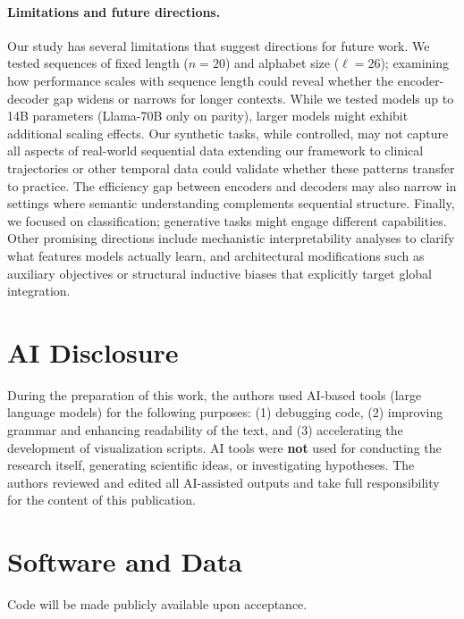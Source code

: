 \documentclass{article}
\theoremstyle{plain}
\theoremstyle{definition}
\theoremstyle{remark}
\begin{document}
\paragraph{Limitations and future directions.} Our study has several limitations that suggest directions for future work. We tested sequences of fixed length ($n=20$) and alphabet size ($\ell=26$); examining how performance scales with sequence length could reveal whether the encoder-decoder gap widens or narrows for longer contexts. While we tested models up to 14B parameters (Llama-70B only on parity), larger models might exhibit additional scaling effects. Our synthetic tasks, while controlled, may not capture all aspects of real-world sequential data extending our framework to clinical trajectories or other temporal data could validate whether these patterns transfer to practice. The efficiency gap between encoders and decoders may also narrow in settings where semantic understanding complements sequential structure. Finally, we focused on classification; generative tasks might engage different capabilities. Other promising directions include mechanistic interpretability analyses to clarify what features models actually learn, and architectural modifications such as auxiliary objectives or structural inductive biases that explicitly target global integration.


\section*{AI Disclosure}
During the preparation of this work, the authors used AI-based tools (large language models) for the following purposes: (1) debugging code, (2) improving grammar and enhancing readability of the text, and (3) accelerating the development of visualization scripts. AI tools were \textbf{not} used for conducting the research itself, generating scientific ideas, or investigating hypotheses. The authors reviewed and edited all AI-assisted outputs and take full responsibility for the content of this publication.

\section*{Software and Data}
Code will be made publicly available upon acceptance.

\end{document}
